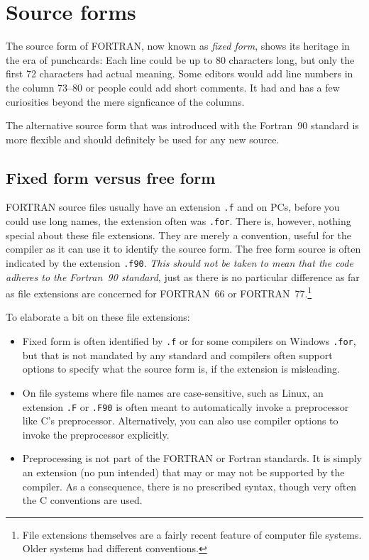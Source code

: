 \section{Source forms}
The source form of FORTRAN, now known as \emph{fixed form}, shows its heritage in the era of punchcards:
Each line could be up to 80 characters long, but only the first 72 characters had actual meaning. Some
editors would add line numbers in the column 73--80 or people could add short comments. It had and has
a few curiosities beyond the mere signficance of the columns.

The alternative source form that was introduced with the Fortran~90 standard is more flexible and should
definitely be used for any new source.


\subsection{Fixed form versus free form}
FORTRAN source files usually have an extension \verb+.f+ and on PCs, before you could use long names,
the extension often was \verb+.for+. There is, however, nothing special about these file extensions. They
are merely a convention, useful for the compiler as it can use it to identify the source form. The
free form source is often indicated by the extension \verb+.f90+. \emph{This should not be taken to mean
that the code adheres to the Fortran~90 standard}, just as there is no particular difference as far as
file extensions are concerned for FORTRAN~66 or FORTRAN~77.\footnote{File extensions themselves are
a fairly recent feature of computer file systems. Older systems had different conventions.}

To elaborate a bit on these file extensions:
\begin{itemize}
\item
Fixed form is often identified by \verb+.f+ or for some compilers on Windows \verb+.for+, but
that is not mandated by any standard and compilers often support options to specify what the
source form is, if the extension is misleading.
\item
On file systems where file names are case-sensitive, such as Linux, an extension \verb+.F+ or \verb+.F90+
is often meant to automatically invoke a preprocessor like C's preprocessor. Alternatively, you
can also use compiler options to invoke the preprocessor explicitly.
\item
Preprocessing is not part of the FORTRAN or Fortran standards. It is simply an extension (no pun intended)
that may or may not be supported by the compiler. As a consequence, there is no prescribed syntax, though
very often the C conventions are used.
\end{itemize}


